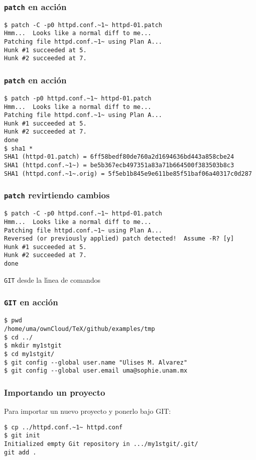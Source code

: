 \documentclass{beamer}
\begin{document}
\begin{frame}[fragile]
  \frametitle{\texttt{patch} en acci\'on}
\begin{verbatim}
$ patch -C -p0 httpd.conf.~1~ httpd-01.patch  
Hmm...  Looks like a normal diff to me...
Patching file httpd.conf.~1~ using Plan A...
Hunk #1 succeeded at 5.
Hunk #2 succeeded at 7.
\end{verbatim}
\end{frame}

\begin{frame}[fragile]
  \frametitle{\texttt{patch} en acci\'on}
\begin{verbatim}
$ patch -p0 httpd.conf.~1~ httpd-01.patch
Hmm...  Looks like a normal diff to me...
Patching file httpd.conf.~1~ using Plan A...
Hunk #1 succeeded at 5.
Hunk #2 succeeded at 7.
done
$ sha1 *                                  
SHA1 (httpd-01.patch) = 6ff58bedf80de760a2d1694636bd443a858cbe24
SHA1 (httpd.conf.~1~) = be5b367ecb497351a83a71b664500f383503b8c3
SHA1 (httpd.conf.~1~.orig) = 5f5eb1b845e9e611be85f51baf06a40317c0d287
\end{verbatim}
\end{frame}

\begin{frame}[fragile]
  \frametitle{\texttt{patch} revirtiendo cambios}
\begin{verbatim}
$ patch -C -p0 httpd.conf.~1~ httpd-01.patch        
Hmm...  Looks like a normal diff to me...
Patching file httpd.conf.~1~ using Plan A...
Reversed (or previously applied) patch detected!  Assume -R? [y] 
Hunk #1 succeeded at 5.
Hunk #2 succeeded at 7.
done
\end{verbatim}
\end{frame}

\begin{frame}[standout]
  \texttt{GIT} desde la l\'\i{}nea de comandos
\end{frame}


\begin{frame}[fragile]
  \frametitle{\texttt{GIT} en acci\'on}
\begin{verbatim}
$ pwd
/home/uma/ownCloud/TeX/github/examples/tmp
$ cd ../
$ mkdir my1stgit
$ cd my1stgit/
$ git config --global user.name "Ulises M. Alvarez"
$ git config --global user.email uma@sophie.unam.mx
\end{verbatim}
\end{frame}


\begin{frame}[fragile]
  \frametitle{Importando un proyecto}
  Para importar un nuevo proyecto y ponerlo bajo GIT:
\begin{verbatim}
$ cp ../httpd.conf.~1~ httpd.conf
$ git init
Initialized empty Git repository in .../my1stgit/.git/
git add .
\end{verbatim}
\end{frame}
\end{document}
